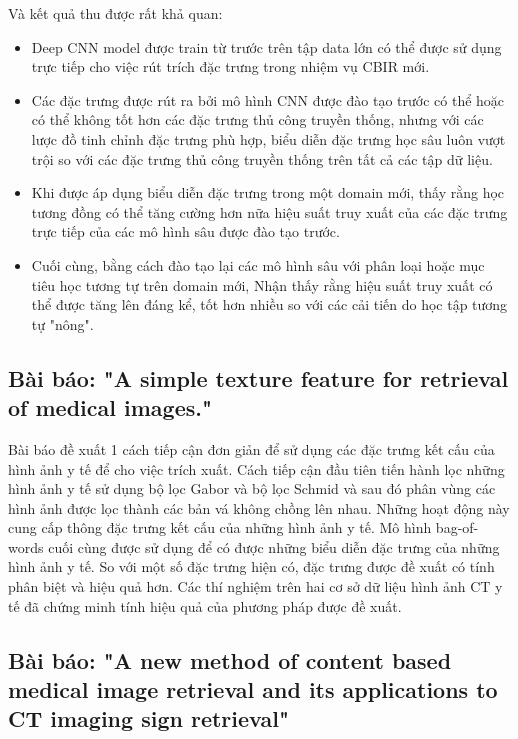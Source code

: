 \documentclass[a4paper,14pt]{extreport}
\begin{document}
Và kết quả thu được rất khả quan:

\begin{itemize}
        \item Deep CNN model được train từ trước trên tập data lớn có thể được sử dụng trực tiếp cho việc rút trích đặc trưng trong nhiệm vụ CBIR mới.
        \item Các đặc trưng được rút ra bởi mô hình CNN được đào tạo trước có thể hoặc có thể không tốt hơn các đặc trưng thủ công truyền thống, nhưng với các lược đồ tinh chỉnh đặc trưng phù hợp, biểu diễn đặc trưng học sâu luôn vượt trội so với các đặc trưng thủ công truyền thống trên tất cả các tập dữ liệu.
        \item Khi được áp dụng biểu diễn đặc trưng trong một domain mới, thấy rằng học tương đồng có thể tăng cường hơn nữa hiệu suất truy xuất của các đặc trưng trực tiếp của các mô hình sâu được đào tạo trước.
        \item Cuối cùng, bằng cách đào tạo lại các mô hình sâu với phân loại hoặc mục tiêu học tương tự trên domain mới, Nhận thấy rằng hiệu suất truy xuất có thể được tăng lên đáng kể, tốt hơn nhiều so với các cải tiến do học tập tương tự "nông".

\end{itemize}

\subsection{Bài báo: "A simple texture feature for retrieval of medical images." \cite{paper-2}}

Bài báo đề xuất 1 cách tiếp cận đơn giản để sử dụng các đặc trưng kết cấu của hình ảnh y tế để cho việc trích xuất. Cách tiếp cận đầu tiên tiến hành lọc những hình ảnh y tế sử dụng bộ lọc Gabor và bộ lọc Schmid và sau đó phân vùng các hình ảnh được lọc thành các bản vá không chồng lên nhau. Những hoạt động này cung cấp thông đặc trưng kết cấu của những hình ảnh y tế. Mô hình bag-of-words cuối cùng được sử dụng để có được những biểu diễn đặc trưng của những hình ảnh y tế. So với một số đặc trưng hiện có, đặc trưng được đề xuất có tính phân biệt và hiệu quả hơn. Các thí nghiệm trên hai cơ sở dữ liệu hình ảnh CT y tế đã chứng minh tính hiệu quả của phương pháp được đề xuất.

\subsection{Bài báo: "A new method of content based medical image retrieval and its applications to CT imaging sign retrieval" \cite{paper-3}}
\end{document}
